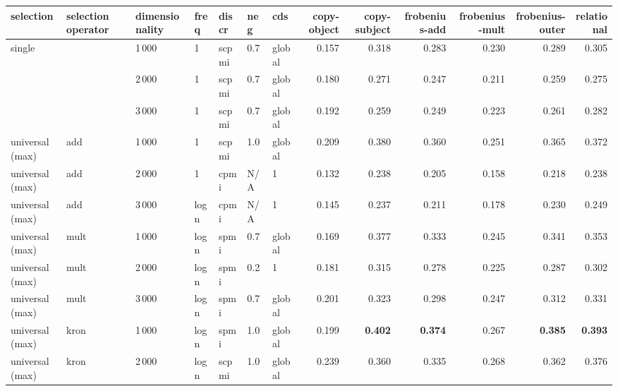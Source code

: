 \begin{tabular}{lllllllrrrrrr}
\toprule
selection & selection operator & dimensionality & freq & discr & neg & cds & copy-object &  copy-subject &  frobenius-add &  frobenius-mult &  frobenius-outer &  relational \\
\midrule
single                 & {}   & 1\,000 & 1    & scpmi  & 0.7 & global &        0.157 &         0.318 &           0.283 &            0.230 &             0.289 &       0.305 \\
                       & {}   & 2\,000 & 1    & scpmi  & 0.7 & global &        0.180 &         0.271 &           0.247 &            0.211 &             0.259 &       0.275 \\
                       & {}   & 3\,000 & 1    & scpmi  & 0.7 & global &        0.192 &         0.259 &           0.249 &            0.223 &             0.261 &       0.282 \\
\addlinespace
universal (max)        & add  & 1\,000 & 1    & scpmi  & 1.0 & global &        0.209 &         0.380 &           0.360 &            0.251 &             0.365 &       0.372 \\
universal (max)        & add  & 2\,000 & 1    & cpmi   & N/A & 1      &        0.132 &         0.238 &           0.205 &            0.158 &             0.218 &       0.238 \\
universal (max)        & add  & 3\,000 & logn & cpmi   & N/A & 1      &        0.145 &         0.237 &           0.211 &            0.178 &             0.230 &       0.249 \\
\addlinespace
universal (max)        & mult & 1\,000 & logn  & spmi  & 0.7 & global &        0.169 &         0.377 &           0.333 &            0.245 &             0.341 &       0.353 \\
universal (max)        & mult & 2\,000 & logn  & spmi  & 0.2 & 1      &        0.181 &         0.315 &           0.278 &            0.225 &             0.287 &       0.302 \\
universal (max)        & mult & 3\,000 & logn  & spmi  & 0.7 & global &        0.201 &         0.323 &           0.298 &            0.247 &             0.312 &       0.331 \\
\addlinespace
universal (max)        & kron & 1\,000 & logn  & spmi  & 1.0 & global &        0.199 &         \textbf{0.402} &           \textbf{0.374} &            0.267 &             \textbf{0.385} &       \textbf{0.393} \\
universal (max)        & kron & 2\,000 & logn  & scpmi & 1.0 & global &        0.239 &         0.360 &           0.335 &            0.268 &             0.362 &       0.376 \\

\end{tabular}
